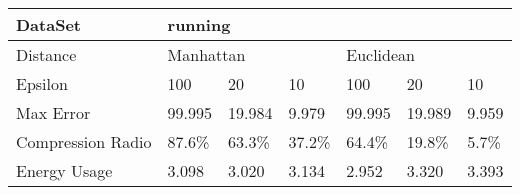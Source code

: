 \documentclass[10pt, conference, compsocconf]{IEEEtran}
\begin{document}
\begin{table}[]
    \caption{}
    \begin{tabular}{|l|l|l|l|l|l|l|}
    \hline
    DataSet           & \multicolumn{6}{l|}{running}                                   \\\hline
    Distance          & \multicolumn{3}{l|}{Manhattan} & \multicolumn{3}{l|}{Euclidean} \\\hline
    Epsilon           & 100      & 20       & 10      & 100      & 20       & 10      \\\hline
    Max Error         & 99.995   & 19.984   & 9.979   & 99.995   & 19.989   & 9.959   \\\hline
    Compression Radio & 87.6\%   & 63.3\%   & 37.2\%  & 64.4\%   & 19.8\%   & 5.7\%   \\\hline
    Energy Usage      & 3.098    & 3.020    & 3.134   & 2.952    & 3.320    & 3.393   \\\hline
    \end{tabular}
\end{table}



\end{document}
